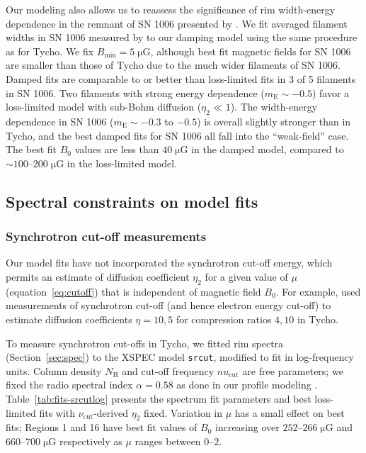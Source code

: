 \documentclass[iop, apj, numberedappendix]{emulateapj}
\newcommand*{\mt}{\mathrm}
\newcommand*{\unit}[1]{\;\mt{#1}}  %
\newcommand*{\abt}{\mathord{\sim}} %
\newcommand*{\mE}{m_\mt{E}}
\newcommand*{\Bmin}{B_{\mt{min}}}
\newcommand*{\muG}{\unit{\mu G}}
\begin{document}
Our modeling also allows us to reassess the significance of rim width-energy
dependence in the remnant of SN 1006 presented by .  We
fit averaged filament widths in SN 1006 measured by  to
our damping model using the same procedure as for Tycho.  We fix $\Bmin = 5
\muG$, although best fit magnetic fields for SN 1006 are smaller than those of
Tycho due to the much wider filaments of SN 1006.
Damped fits are comparable to or better than loss-limited fits in 3 of 5
filaments in SN 1006.  Two filaments with strong energy dependence ($\mE \sim
-0.5$) favor a loss-limited model with sub-Bohm diffusion ($\eta_2 \ll 1$).
The width-energy dependence in SN 1006 ($\mE \sim -0.3$ to $-0.5$) is overall
slightly stronger than in Tycho, and the best damped fits for SN 1006 all fall
into the ``weak-field'' case.  The best fit $B_0$ values are less than $40
\muG$ in the damped model, compared to $\abt 100$--$200 \muG$ in the
loss-limited model.

\subsection{Spectral constraints on model fits}

\subsubsection{Synchrotron cut-off measurements}

Our model fits have not incorporated the synchrotron cut-off energy, which
permits an estimate of diffusion coefficient $\eta_2$ for a given value of
$\mu$ (equation~\eqref{eq:cutoff}) that is independent of magnetic field
$B_0$.  For example, \citet{parizot2006} used measurements of synchrotron
cut-off (and hence electron energy cut-off) to estimate diffusion coefficients
$\eta = 10, 5$ for compression ratios $4, 10$ in Tycho.

To measure synchrotron cut-offs in Tycho, we fitted rim spectra
(Section~\ref{sec:spec}) to the XSPEC model \texttt{srcut}, modified to fit in
log-frequency units.  Column density $N_{\mt{H}}$ and cut-off frequency
$nu_{\mt{cut}}$ are free parameters; we fixed the radio spectral index $\alpha
= 0.58$ as done in our profile modeling \citep{sun2011}.
Table~\ref{tab:fits-srcutlog} presents the spectrum fit parameters and best
loss-limited fits with $\nu_{\mt{cut}}$-derived $\eta_2$ fixed.
Variation in $\mu$ has a small effect on best fits; Regions 1 and 16 have best
fit values of $B_0$ increasing over $252$--$266 \muG$ and $660$--$700 \muG$
respectively as $\mu$ ranges between $0$--$2$.
\end{document}
